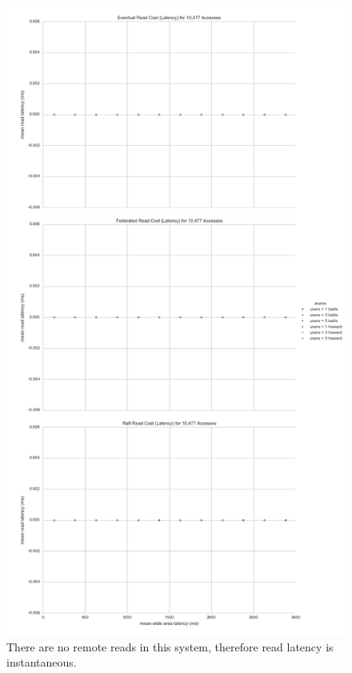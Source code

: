 \documentclass[10pt,letterpaper]{article}
\begin{document}
\begin{figure}[!h]
    \centering
        \includegraphics[height=0.9\textheight]{figures/read_latency.png}
        \caption{\textsf{There are no remote reads in this system, therefore read latency is instantaneous.}}
        \label{fig:read_latency}
\end{figure}
\end{document}
